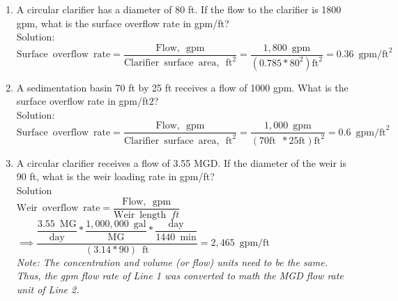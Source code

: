 \begin{enumerate}
\vspace{0.5cm}

\item A circular clarifier has a diameter of 80 ft. If the flow to the clarifier is 1800 gpm, what is the surface overflow rate in gpm/ft?\\
\vspace{0.2cm}
Solution:\\

$\mathrm{Surface \enspace overflow \enspace rate}=\dfrac{\mathrm{Flow, \enspace gpm}}{\mathrm{Clarifier \enspace surface \enspace area, \enspace ft}^2}=\dfrac{1,800 \enspace \mathrm{gpm}}{(0.785*80^2 )\mathrm{ft}^2}=\boxed{0.36 \enspace \mathrm{gpm/ft}^2}$

\vspace{0.2cm}
\item A sedimentation basin 70 ft by 25 ft receives a flow of 1000 gpm. What is the surface overflow rate in gpm/ft$2$?\\
\vspace{0.2cm}
Solution:\\
$\mathrm{Surface \enspace overflow \enspace rate}=\dfrac{\mathrm{Flow, \enspace gpm}}{\mathrm{Clarifier \enspace surface \enspace area, \enspace ft}^2}=\dfrac{1,000 \enspace \mathrm{gpm}}{(70 \mathrm{ft} \enspace * 25 \mathrm{ft})\mathrm{ft}^2}=\boxed{0.6 \enspace \mathrm{gpm/ft}^2}$

\vspace{0.2cm}

\item A circular clarifier receives a flow of 3.55 MGD. If the diameter of the weir is 90 ft, what is the weir loading rate in gpm/ft?\\

\vspace{0.2cm}
Solution\\

$\mathrm{Weir \enspace overflow \enspace rate}=\dfrac{\mathrm{Flow, \enspace gpm}}{\mathrm{Weir} \enspace \mathrm{length} \enspace ft}$\\
\vspace{0.3cm}
$\implies \dfrac{ \dfrac{3.55 \enspace \mathrm{MG}}{\mathrm{day}}*\dfrac{1,000,000 \enspace \mathrm{gal}}{\mathrm{MG}}*\dfrac{\mathrm{day}}{1440 \enspace \mathrm{min}}}{ (3.14*90) \enspace \mathrm{ft}}=\boxed{2,465 \enspace  \mathrm{gpm/ft}}$\\
\vspace{0.3cm}
\textit{Note: The concentration and volume (or flow) units need to be the same.  Thus, the gpm flow rate of Line 1 was converted to math the MGD flow rate unit of Line 2.}


\end{enumerate}

